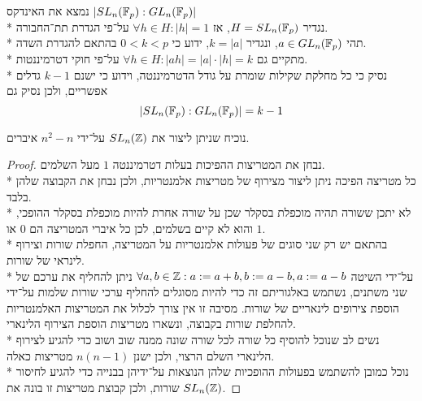 \Subquestion{}
נמצא את האינדקס $|SL_n(\mathbb{F}_p) : GL_n(\mathbb{F}_p)|$ \\*
נגדיר $H = SL_n(\mathbb{F}_p)$, אז $\forall h \in H : |h| = 1$ על־פי הגדרת תת־החבורה. \\*
תהי $a \in GL_n(\mathbb{F}_p)$, ונגדיר $k = |a|$, ידוע כי $0 < k < p$ בהתאם להגדרת השדה. \\*
מתקיים גם $\forall h \in H : |ah| = |a| \cdot |h| = k$ על־פי חוקי דטרמיננטות. \\*
נסיק כי כל מחלקת שקילות שומרת על גודל הדטרמיננטה, וידוע כי ישנם $k - 1$ גדלים אפשריים, ולכן נסיק גם
\[
	|SL_n(\mathbb{F}_p) : GL_n(\mathbb{F}_p)| = k - 1
\]

\Question{}
נוכיח שניתן ליצור את $SL_n(\mathbb{Z})$ על־ידי $n^2 - n$ איברים.
\begin{proof}
	נבחן את המטריצות ההפיכות בעלות דטרמיננטה $1$ מעל השלמים. \\*
	כל מטריצה הפיכה ניתן ליצור מצירוף של מטריצות אלמנטריות, ולכן נבחן את הקבוצה שלהן בלבד. \\*
	לא יתכן ששורה תהיה מוכפלת בסקלר שכן על שורה אחרת להיות מוכפלת בסקלר ההופכי, והוא לא קיים בשלמים, לכן כל איברי המטריצה הם $0$ או $1$. \\*
	בהתאם יש רק שני סוגים של פעולות אלמנטריות על המטריצה, החפלת שורות וצירוף לינראי של שורות. \\*
	על־ידי השיטה $\forall a, b \in \mathbb{Z}: a := a + b, b := a - b, a := a - b$ ניתן להחליף את ערכם של שני משתנים, נשתמש באלגוריתם זה כדי להיות מסוגלים להחליף ערכי שורות שלמות על־ידי הוספת צירופים לינאריים של שורות.
	מסיבה זו אין צורך לכלול את המטריצות האלמנטריות להחלפת שורות בקבוצה, ונשארו מטריצות הוספת הצירוף הלינארי. \\*
	נשים לב שנוכל להוסיף כל שורה לכל שורה שונה ממנה שוב ושוב כדי להגיע לצירוף הלינארי השלם הרצוי, ולכן ישנן $n(n - 1)$ מטריצות כאלה. \\*
	נוכל כמובן להשתמש בפעולות ההופכיות שלהן הנוצאות על־ידיהן בבנייה כדי להגיע לחיסור שורות, ולכן קבוצת מטריצות זו בונה את $SL_n(\mathbb{Z})$.
\end{proof}


